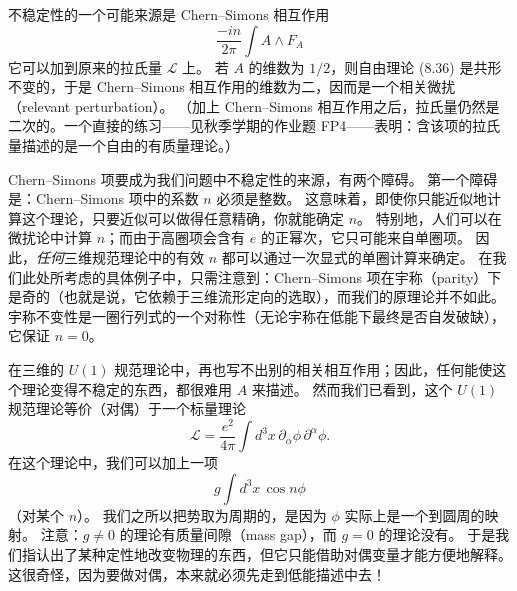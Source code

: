

不稳定性的一个可能来源是 Chern--Simons 相互作用
\begin{equation}
  \tag{8.37}
  \label{eq:8-37}
  \frac{-in}{2\pi}\int A\wedge F_A
\end{equation}
它可以加到原来的拉氏量 $\mathcal{L}$ 上。
若 $A$ 的维数为 $1/2$，则自由理论 (8.36) 是共形不变的，于是 Chern--Simons 相互作用的维数为二，因而是一个相关微扰（relevant perturbation）。
（加上 Chern--Simons 相互作用之后，拉氏量仍然是二次的。一个直接的练习——见秋季学期的作业题 FP4——表明：含该项的拉氏量描述的是一个自由的有质量理论。）

Chern--Simons 项要成为我们问题中不稳定性的来源，有两个障碍。
第一个障碍是：Chern--Simons 项中的系数 $n$ 必须是整数。
这意味着，即使你只能近似地计算这个理论，只要近似可以做得任意精确，你就能确定 $n$。
特别地，人们可以在微扰论中计算 $n$；而由于高圈项会含有 $e$ 的正幂次，它只可能来自单圈项。
因此，\emph{任何}三维规范理论中的有效 $n$ 都可以通过一次显式的单圈计算来确定。
在我们此处所考虑的具体例子中，只需注意到：Chern--Simons 项在宇称（parity）下是奇的（也就是说，它依赖于三维流形定向的选取），而我们的原理论并不如此。
宇称不变性是一圈行列式的一个对称性（无论宇称在低能下最终是否自发破缺），它保证 $n=0$。


在三维的 $U(1)$ 规范理论中，再也写不出别的相关相互作用；因此，任何能使这个理论变得不稳定的东西，都很难用 $A$ 来描述。
然而我们已看到，这个 $U(1)$ 规范理论等价（对偶）于一个标量理论
\begin{equation}
  \tag{8.38}
  \label{eq:8-38}
  \mathcal{L}=\frac{e^2}{4\pi}\int d^3x\,\partial_\alpha\phi\,\partial^\alpha\phi .
\end{equation}
在这个理论中，我们可以加上一项
\begin{equation}
  \tag{8.39}
  \label{eq:8-39}
  g\int d^3x\,\cos n\phi
\end{equation}
（对某个 $n$）。
我们之所以把势取为周期的，是因为 $\phi$ 实际上是一个到圆周的映射。
注意：$g\ne0$ 的理论有质量间隙（mass gap），而 $g=0$ 的理论没有。
于是我们指认出了某种定性地改变物理的东西，但它只能借助对偶变量才能方便地解释。
这很奇怪，因为要做对偶，本来就必须先走到低能描述中去！

